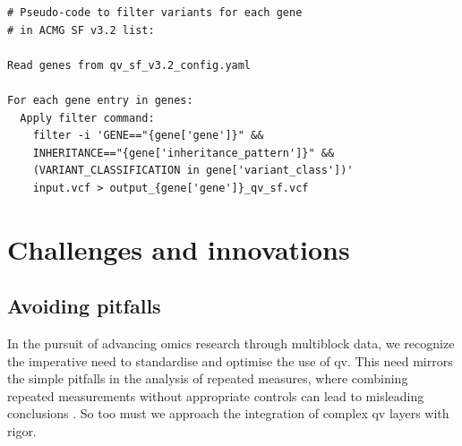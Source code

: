 \begin{tcolorbox}[
    breakable,  %
    colback=white!0,  %
    colframe=black,  %
    boxrule=1pt,  %
    arc=1mm,  %
    outer arc=1mm,
    title=\textbf{\refstepcounter{myboxcounter}\label{box:qv_variables_example_sf2}Box \themyboxcounter: Filtering command for QV SF}
]
\begin{verbatim}
# Pseudo-code to filter variants for each gene 
# in ACMG SF v3.2 list:

Read genes from qv_sf_v3.2_config.yaml

For each gene entry in genes:
  Apply filter command:
    filter -i 'GENE=="{gene['gene']}" && 
    INHERITANCE=="{gene['inheritance_pattern']}" && 
    (VARIANT_CLASSIFICATION in gene['variant_class'])' 
    input.vcf > output_{gene['gene']}_qv_sf.vcf
\end{verbatim}
\end{tcolorbox}

\section{Challenges and innovations}
\subsection{Avoiding pitfalls}
In the pursuit of advancing omics research through multiblock data, we recognize the imperative need to standardise and optimise the use of \ac{qv}. 
This need mirrors the simple pitfalls in the analysis of repeated measures, where combining repeated measurements without appropriate controls can lead to misleading conclusions
\cite{bland1994correlation}.
So too must we approach the integration of complex \ac{qv} layers with rigor.

